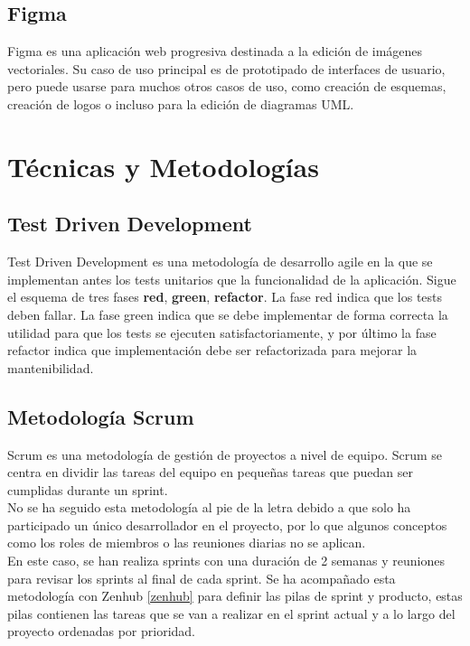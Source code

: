 \subsection{Figma}
Figma es una aplicación web progresiva destinada a la edición de imágenes vectoriales. Su caso de uso principal es de prototipado de interfaces de usuario, pero puede usarse para muchos otros casos de uso, como creación de esquemas, creación de logos o incluso para la edición de diagramas UML. 


\section{Técnicas y Metodologías}

\subsection{Test Driven Development}\label{test_driven_dev}
Test Driven Development es una metodología de desarrollo agile en la que se implementan antes los tests unitarios que la funcionalidad de la aplicación. Sigue el esquema de tres fases \textbf{red}, \textbf{green}, \textbf{refactor}. La fase red indica que los tests deben fallar. La fase green indica que se debe implementar de forma correcta la utilidad para que los tests se ejecuten satisfactoriamente, y por último la fase refactor indica que implementación debe ser refactorizada para mejorar la mantenibilidad. 


\subsection{Metodología Scrum}
Scrum es una metodología de gestión de proyectos a nivel de equipo. Scrum se centra en dividir las tareas del equipo en pequeñas tareas que puedan ser cumplidas durante un sprint.\\
No se ha seguido esta metodología al pie de la letra debido a que solo ha participado un único desarrollador en el proyecto, por lo que algunos conceptos como los roles de miembros o las reuniones diarias no se aplican.\\
En este caso, se han realiza sprints con una duración de 2 semanas y reuniones para revisar los sprints al final de cada sprint. Se ha acompañado esta metodología con Zenhub \ref{zenhub} para definir las pilas de sprint y producto, estas pilas contienen las tareas que se van a realizar en el sprint actual y a lo largo del proyecto ordenadas por prioridad. 



